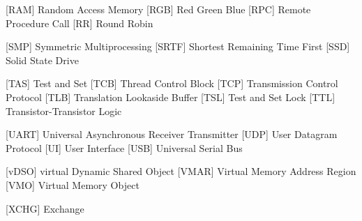 \begin{acronym} [POSIX]

  [RAM] {Random Access Memory}
 [RGB] {Red Green Blue}
 [RPC] {Remote Procedure Call}
 [RR] {Round Robin}

 [SMP] {Symmetric Multiprocessing}
 [SRTF] {Shortest Remaining Time First}
 [SSD] {Solid State Drive}

 [TAS] {Test and Set}
 [TCB] {Thread Control Block}
 [TCP] {Transmission Control Protocol}
 [TLB] {Translation Lookaside Buffer}
 [TSL] {Test and Set Lock}
 [TTL] {Transistor-Transistor Logic}

 [UART] {Universal Asynchronous Receiver Transmitter}
 [UDP] {User Datagram Protocol} 
  [UI]  {User Interface}
 [USB] {Universal Serial Bus}

 [vDSO] {virtual Dynamic Shared Object}
 [VMAR] {Virtual Memory Address Region}
  [VMO]  {Virtual Memory Object}


 [XCHG] {Exchange}



\end{acronym} 
